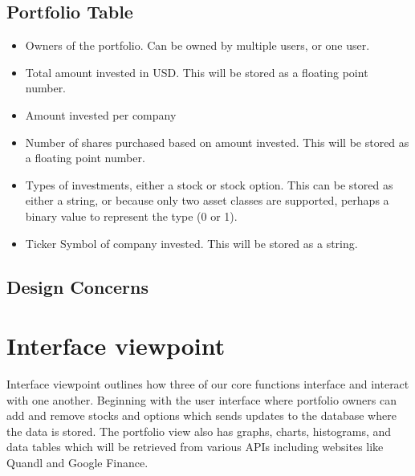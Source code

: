\documentclass[onecolumn, draftclsnofoot,10pt, compsoc]{IEEEtran}
\begin{document}
\subsection{Portfolio Table}
\begin{itemize}
    \item Owners of the portfolio. Can be owned by multiple users, or one user.
    \item Total amount invested in USD. This will be stored as a floating point number.
    \item Amount invested per company
    \item Number of shares purchased based on amount invested. This will be stored as a floating point number.
    \item Types of investments, either a stock or stock option. This can be stored as either a string, or because only two asset classes are supported, perhaps a binary value to represent the type (0 or 1).
    \item Ticker Symbol of company invested. This will be stored as a string.

\end{itemize}


\subsection{Design Concerns}

\section{Interface viewpoint}
    Interface viewpoint outlines how three of our core functions interface and interact with one another.
    Beginning with the user interface where portfolio owners can add and remove stocks and options which
    sends updates to the database where the data is stored. The portfolio view also has graphs, charts, histograms,
    and data tables which will be retrieved from various APIs including websites like Quandl and Google Finance.
    
\end{document}
